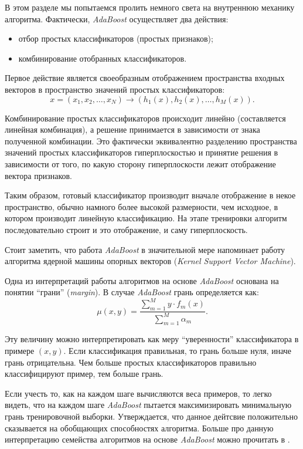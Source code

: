 В этом разделе мы попытаемся пролить немного света на внутреннюю механику алгоритма. Фактически, \emph{AdaBoost} осуществляет два действия:
\begin{itemize}
  \item отбор простых классификаторов (простых признаков);
  \item комбинирование отобранных классификаторов.
\end{itemize}

Первое действие является своеобразным отображением пространства входных векторов в пространство значений простых классификаторов:
\begin{displaymath}
  x = (x_1, x_2, \dots, x_N) \to (h_1(x), h_2(x), \dots, h_M(x)).
\end{displaymath}

Комбинирование простых классификаторов происходит линейно (составляется линейная комбинация), а решение принимается в зависимости от знака полученной комбинации. Это фактически эквивалентно разделению пространства значений простых классификаторов гиперплоскостью и принятие решения в зависимости от того, по какую сторону гиперплоскости лежит отображение вектора признаков.

Таким образом, готовый классификатор производит вначале отображение в некое пространство, обычно намного более высокой размерности, чем исходное, в котором производит линейную классификацию. На этапе тренировки алгоритм последовательно строит и это отображение, и саму гиперплоскость.

Стоит заметить, что работа \emph{AdaBoost} в значительной мере напоминает работу алгоритма ядерной машины опорных векторов (\emph{Kernel Support Vector Machine}).

Одна из интерпретаций работы алгоритмов на основе \emph{AdaBoost} основана на понятии ``грани'' (\emph{margin}). В случае \emph{AdaBoost} грань определяется как:
\begin{displaymath}
  \mu(x, y) = \frac{\sum_{m = 1}^M{y \cdot f_m(x)}}{\sum_{m = 1}^M{\alpha_m}}.
\end{displaymath}

Эту величину можно интерпретировать как меру ``уверенности'' классификатора в примере $(x, y)$. Если классификация правильная, то грань больше нуля, иначе грань отрицательна. Чем больше простых классификаторов правильно классифицируют пример, тем больше грань.

Если учесть то, как на каждом шаге вычисляются веса примеров, то легко видеть, что на каждом шаге \emph{AdaBoost} пытается максимизировать минимальную грань тренировочной выборки. Утверждается, что данное дейтсвие положительно сказывается на обобщающих способностях алгоритма. Больше про данную интерпретацию семейства алгоритмов на основе \emph{AdaBoost} можно прочитать в \cite{rosset04}.

